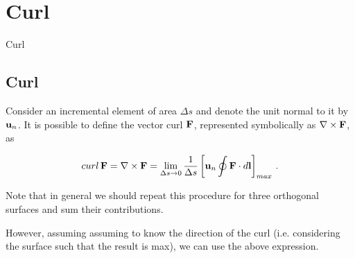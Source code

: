 \documentclass[handout,10pt]{beamer}
\begin{document}
\section{Curl}

\begin{frame}[shrink=00]{Curl}

\subsection{Curl}
%
 Consider an incremental element of area $\Delta s$ and denote the unit normal to it by $\mathbf{u}_n$. It is possible to define the vector curl $\mathbf{F}$, represented symbolically as $\nabla \times {\bf F}$, as
 
\begin{equation}
curl \, {\bf F} = \nabla \times {\bf F} = \lim_{\Delta s \to 0} \frac{1}{\Delta s}   \left[{\bf u}_n  \oint {\bf F}\cdot d{\bf l} \right]_{max} \, .  \label{curldef}
\end{equation}

Note that in general we should repeat this procedure for three orthogonal surfaces and sum their contributions. 

However, assuming assuming to know the direction of the curl (i.e. considering the surface such that the result is max), we can use the above expression.

\end{frame}

\end{document}
